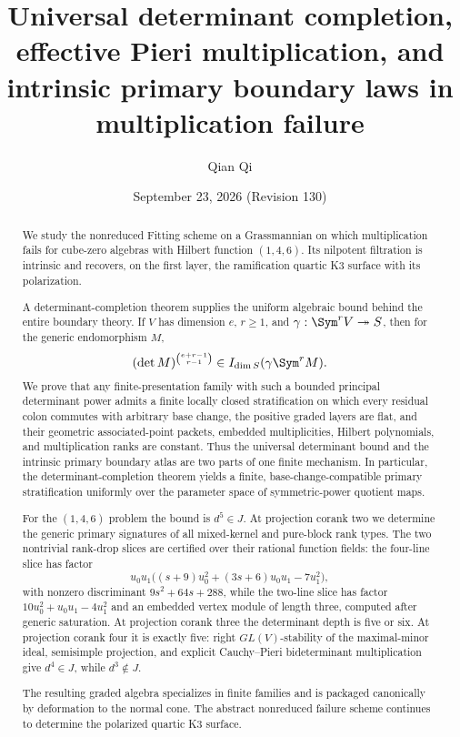 \title[Universal determinant completion and boundary laws]{Universal determinant completion, effective Pieri multiplication, and intrinsic primary boundary laws in multiplication failure}
\author{Qian Qi}
\date{September 23, 2026 \quad (Revision 130)}
\begin{abstract}
We study the nonreduced Fitting scheme on a Grassmannian on which
multiplication fails for cube-zero algebras with Hilbert function
\((1,4,6)\).  Its nilpotent filtration is intrinsic and recovers,
on the first layer, the ramification quartic K3 surface with its
polarization.

A determinant-completion theorem supplies the uniform algebraic bound
behind the entire boundary theory.  If \(V\) has dimension \(e\),
\(r\ge1\), and \(\gamma:\Sym^rV\twoheadrightarrow S\), then for the
generic endomorphism \(M\),
\[
 (\det M)^{\binom{e+r-1}{r-1}}
 \in I_{\dim S}(\gamma\Sym^rM).
\]
We prove that any finite-presentation family with such a bounded
principal determinant power admits a finite locally closed
stratification on which every residual colon commutes with arbitrary
base change, the positive graded layers are flat, and their geometric
associated-point packets, embedded multiplicities, Hilbert polynomials,
and multiplication ranks are constant.  Thus the universal determinant bound and the intrinsic primary boundary atlas are two parts of one finite mechanism.  In particular, the determinant-completion theorem yields a finite, base-change-compatible primary stratification uniformly over the parameter space of symmetric-power quotient maps.

For the \((1,4,6)\) problem the bound is \(d^5\in J\).
At projection corank two we determine the generic primary signatures
of all mixed-kernel and pure-block rank types.  The two nontrivial
rank-drop slices are certified over their rational function fields:
the four-line slice has factor
\[
 u_0u_1\bigl((s+9)u_0^2+(3s+6)u_0u_1-7u_1^2\bigr),
\]
with nonzero discriminant \(9s^2+64s+288\), while the two-line slice
has factor \(10u_0^2+u_0u_1-4u_1^2\) and an embedded vertex module of
length three, computed after generic saturation.  At projection
corank three the determinant depth is five or six.  At projection
corank four it is exactly five: right \(GL(V)\)-stability of the
maximal-minor ideal, semisimple projection, and explicit
Cauchy--Pieri bideterminant multiplication give \(d^4\in J\), while
\(d^3\notin J\).

The resulting graded algebra specializes in finite families and is
packaged canonically by deformation to the normal cone.  The abstract
nonreduced failure scheme continues to determine the polarized quartic
K3 surface.
\end{abstract}
\maketitle
